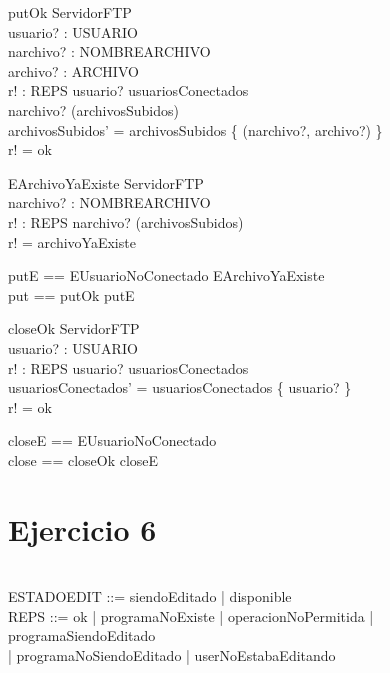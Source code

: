 \documentclass[11pt]{article}
\begin{document}
  \begin{schema}{putOk}
  \Delta ServidorFTP \\
  usuario? : USUARIO \\
  narchivo? : NOMBREARCHIVO \\
  archivo? : ARCHIVO \\
  r! : REPS
  \where
  usuario? \in usuariosConectados \\
  narchivo? \notin (\dom archivosSubidos) \\
  archivosSubidos' = archivosSubidos \cup \{ (narchivo?, archivo?) \} \\
  r! = ok
  \end{schema}
  
  \begin{schema}{EArchivoYaExiste}
  \Xi ServidorFTP \\
  narchivo? : NOMBREARCHIVO \\
  r! : REPS
  \where
  narchivo? \in (\dom archivosSubidos) \\
  r! = archivoYaExiste
  \end{schema}
  
  \begin{zed}
  putE == EUsuarioNoConectado \lor EArchivoYaExiste \\
  put == putOk \lor putE
  \end{zed}
  
  \begin{schema}{closeOk}
  \Delta ServidorFTP \\
  usuario? : USUARIO \\
  r! : REPS
  \where
  usuario? \in usuariosConectados \\
  usuariosConectados' = usuariosConectados \setminus \{ usuario? \} \\
  r! = ok
  \end{schema}
  
  \begin{zed}
  closeE == EUsuarioNoConectado \\
  close == closeOk \lor closeE
  \end{zed}


\section*{Ejercicio 6}

\begin{zed}
   \\
  ESTADOEDIT ::= siendoEditado | disponible \\
  REPS ::= ok | programaNoExiste | operacionNoPermitida | programaSiendoEditado \\ 
  | programaNoSiendoEditado | userNoEstabaEditando
  \end{zed}
  
\end{document}
